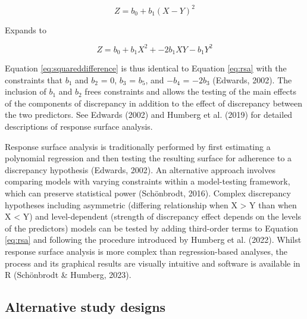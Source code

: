 \documentclass[
]{article}
\begin{document}
\begin{equation}
Z = b_{0} + b_{1}(X - Y)^{2}
\label{eq:squareddifference}
\end{equation}

Expands to

\begin{equation}
Z = b_{0} + b_{1}X^{2} + - 2b_{1}XY - b_{1}Y^{2}
\label{eq:expanded}
\end{equation}

Equation \eqref{eq:squareddifference} is thus identical to Equation \eqref{eq:rsa} with the constraints that \(b_{1}\) and \(b_{2}\) = 0, \(b_{3}\) = \(b_{5}\), and \(-b_{4}\) = \(-2b_{3}\) (Edwards, 2002). The inclusion of \(b_{1}\) and \(b_{2}\) frees constraints and allows the testing of the main effects of the components of discrepancy in addition to the effect of discrepancy between the two predictors. See Edwards (2002) and Humberg et al. (2019) for detailed descriptions of response surface analysis.

Response surface analysis is traditionally performed by first estimating a polynomial regression and then testing the resulting surface for adherence to a discrepancy hypothesis (Edwards, 2002). An alternative approach involves comparing models with varying constraints within a model-testing framework, which can preserve statistical power (Schönbrodt, 2016). Complex discrepancy hypotheses including asymmetric (differing relationship when X \textgreater{} Y than when X \textless{} Y) and level-dependent (strength of discrepancy effect depends on the levels of the predictors) models can be tested by adding third-order terms to Equation \eqref{eq:rsa} and following the procedure introduced by Humberg et al. (2022). Whilst response surface analysis is more complex than regression-based analyses, the process and its graphical results are visually intuitive and software is available in R (Schönbrodt \& Humberg, 2023).

\subsection{Alternative study designs}\label{alternative-study-designs}
\end{document}
